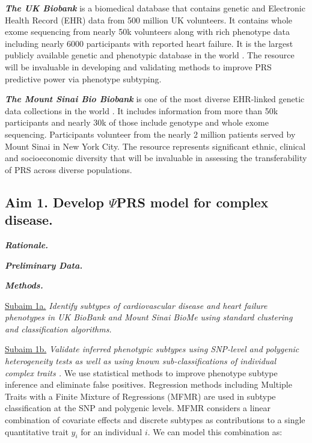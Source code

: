 \documentclass[11pt]{article}  %
\newlength\tindent
\renewcommand{\indent}{\hspace*{\tindent}}
\begin{document}
\textbf{\textit{The UK Biobank}} is a biomedical database that contains genetic and Electronic Health Record (EHR) data from 500 million UK volunteers. It contains whole exome sequencing from nearly 50k volunteers along with rich phenotype data including nearly 6000 participants with reported heart failure. It is the largest publicly available genetic and phenotypic database in the world \cite{sudlow_uk_2015}. The resource will be invaluable in developing and validating methods to improve PRS predictive power via phenotype subtyping.

\textbf{\textit{The Mount Sinai Bio Biobank}} is one of the most diverse EHR-linked genetic data collections in the world \cite{belbin_toward_2021}. It includes information from more than 50k participants and nearly 30k of those include genotype and whole exome sequencing. Participants volunteer from the nearly 2 million patients served by Mount Sinai in New York City. The resource represents significant ethnic, clinical and socioeconomic diversity that will be invaluable in assessing the transferability of PRS across diverse populations.   


\subsection*{Aim 1. Develop $\Psi$PRS model for complex disease.}

\indent \textbf{\textit{Rationale.}}

\indent \textbf{\textit{Preliminary Data.}}

\indent \textbf{\textit{Methods.}}

\indent \underline{Subaim 1a.} \textit{Identify subtypes of cardiovascular disease and heart failure phenotypes in UK BioBank and Mount Sinai BioMe using standard clustering and classification algorithms.}

\indent \underline{Subaim 1b.} \textit{Validate inferred phenotypic subtypes using SNP-level \cite{dahl_reverse_2019} and polygenic heterogeneity tests \cite{dahl_robust_2020} as well as using known sub-classifications of individual complex traits \cite{li_identification_2015} \cite{mordi_differential_2019}.} We use statistical methods to improve phenotype subtype inference and eliminate false positives. Regression methods including Multiple Traits with a Finite Mixture of Regressions (MFMR) \cite{dahl_reverse_2019} are used in subtype classification at the SNP and polygenic levels. MFMR considers a linear combination of covariate effects and discrete subtypes as contributions to a single quantitative trait $y_i$ for an individual $i$. We can model this combination as:
\end{document}
